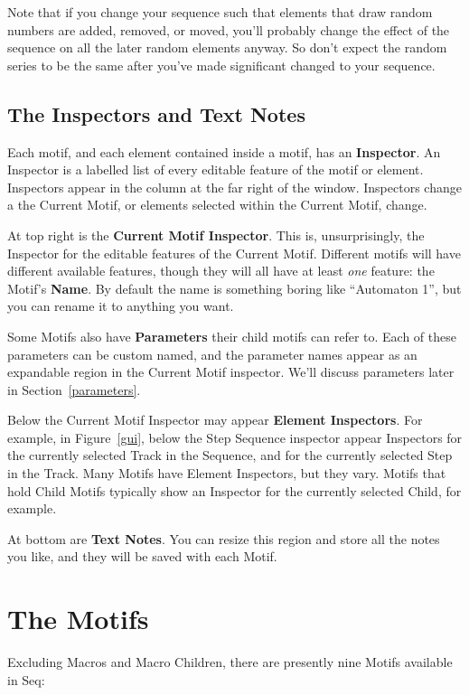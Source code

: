 \documentclass[twoside,10pt]{article}
\begin{document}
Note that if you change your sequence such that elements that draw random numbers are added, removed, or moved, you'll probably change the effect of the sequence on all the later random elements anyway.  So don't expect the random series to be the same after you've made significant changed to your sequence.

\subsection{The Inspectors and Text Notes}

Each motif, and each element contained inside a motif, has an {\bf Inspector}.  An Inspector is a labelled list of every editable feature of the motif or element.  Inspectors appear in the column at the far right of the window.  Inspectors change a the Current Motif, or elements selected within the Current Motif, change.

At top right is the {\bf Current Motif Inspector}.  This is, unsurprisingly, the Inspector for the editable features of the Current Motif.  Different motifs will have different available features, though they will all have at least {\it one} feature: the Motif's {\bf Name}.  By default the name is something boring like ``Automaton 1'', but you can rename it to anything you want.

Some Motifs also have {\bf Parameters} their child motifs can refer to.  Each of these parameters can be custom named, and the parameter names appear as an expandable region in the Current Motif inspector.  We'll discuss parameters later in Section~\ref{parameters}.

Below the Current Motif Inspector may appear {\bf Element Inspectors}.  For example, in Figure~\ref{gui}, below the Step Sequence inspector appear Inspectors for the currently selected Track in the Sequence, and for the currently selected Step in the Track.  Many Motifs have Element Inspectors, but they vary.  Motifs that hold Child Motifs typically show an Inspector for the currently selected Child, for example.

At bottom are {\bf Text Notes}.  You can resize this region and store all the notes you like, and they will be saved with each Motif.

\clearpage\section{The Motifs}
\label{motifs}

Excluding Macros and Macro Children, there are presently nine Motifs available in Seq:
\end{document}
